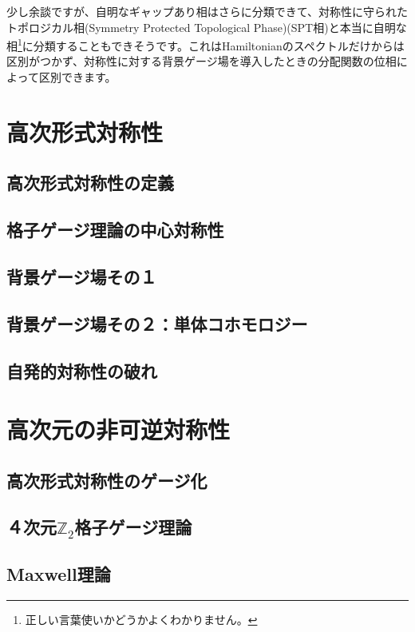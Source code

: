 \documentclass[report,paper=a4, fontsize=12pt, line_length=16cm, number_of_lines=33,dvipdfmx]{jlreq}
\numberwithin{equation}{chapter}
\newcommand{\Ztwo}{\mbox{$\mathbb{Z}_{2}$}}
\begin{document}
少し余談ですが、自明なギャップあり相はさらに分類できて、対称性に守られたトポロジカル相(Symmetry Protected Topological Phase)(SPT相)と本当に自明な相\footnote{正しい言葉使いかどうかよくわかりません。}に分類することもできそうです。これはHamiltonianのスペクトルだけからは区別がつかず、対称性に対する背景ゲージ場を導入したときの分配関数の位相によって区別できます。

\chapter{高次形式対称性}
\section{高次形式対称性の定義}
\section{格子ゲージ理論の中心対称性}
\section{背景ゲージ場その１}
\section{背景ゲージ場その２：単体コホモロジー}
\section{自発的対称性の破れ}


\chapter{高次元の非可逆対称性}
\section{高次形式対称性のゲージ化}
\section{４次元\texorpdfstring{\Ztwo}{Z2}格子ゲージ理論}
\section{Maxwell理論}



\end{document}
